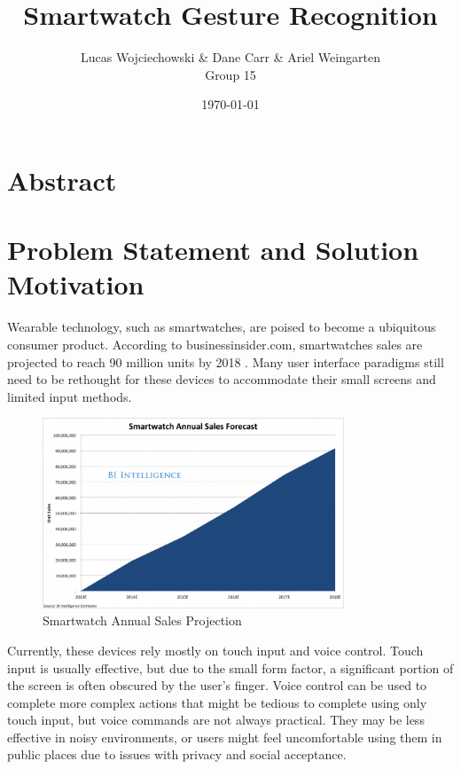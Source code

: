 \documentclass{report}
\title{Smartwatch Gesture Recognition}
\date{\today}
\author{
  Lucas Wojciechowski \& Dane Carr \& Ariel Weingarten \\
  Group 15
}
\begin{document}
\maketitle


\chapter{Abstract}


\chapter{Problem Statement and Solution Motivation}
Wearable technology, such as smartwatches, are poised to become a ubiquitous consumer product. According to businessinsider.com, smartwatches sales are projected to reach 90 million units by 2018 \cite{BusinessInsider}. Many user interface paradigms still need to be rethought for these devices to accommodate their small screens and limited input methods. 

\begin{figure}[ht!]
  \centering
  \includegraphics[width=90mm]{smartwatch.png}
  \caption{Smartwatch Annual Sales Projection \label{overflow}}
\end{figure}

Currently, these devices rely mostly on touch input and voice control. Touch input is usually effective, but due to the small form factor, a significant portion of the screen is often obscured by the user's finger. Voice control can be used to complete more complex actions that might be tedious to complete using only touch input, but voice commands are not always practical. They may be less effective in noisy environments, or users might feel uncomfortable using them in public places due to issues with privacy and social acceptance.
\end{document}
